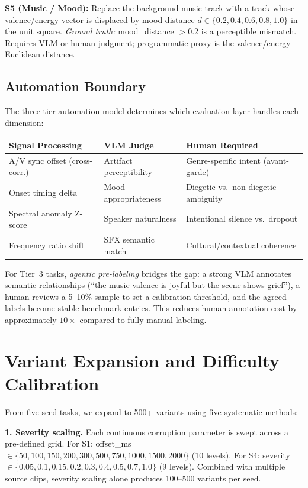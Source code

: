 \documentclass[11pt]{article}
\begin{document}
\textbf{S5 (Music / Mood):} Replace the background music track with a track whose
valence/energy vector is displaced by mood distance $d \in \{0.2, 0.4, 0.6, 0.8, 1.0\}$
in the unit square. \emph{Ground truth:} mood\_distance $> 0.2$ is a perceptible mismatch.
Requires VLM or human judgment; programmatic proxy is the valence/energy Euclidean distance.

\subsection{Automation Boundary}

The three-tier automation model determines which evaluation layer handles each dimension:

\begin{center}
\begin{tabular}{p{3.5cm}p{3.5cm}p{4cm}}
\toprule
Signal Processing & VLM Judge & Human Required \\
\midrule
A/V sync offset (cross-corr.) &
Artifact perceptibility &
Genre-specific intent (avant-garde) \\
Onset timing delta &
Mood appropriateness &
Diegetic vs.\ non-diegetic ambiguity \\
Spectral anomaly Z-score &
Speaker naturalness &
Intentional silence vs.\ dropout \\
Frequency ratio shift &
SFX semantic match &
Cultural/contextual coherence \\
\bottomrule
\end{tabular}
\end{center}

For Tier~3 tasks, \emph{agentic pre-labeling} bridges the gap: a strong VLM annotates
semantic relationships (``the music valence is joyful but the scene shows grief''), a human
reviews a 5--10\% sample to set a calibration threshold, and the agreed labels become stable
benchmark entries. This reduces human annotation cost by approximately $10\times$ compared
to fully manual labeling.

\section{Variant Expansion and Difficulty Calibration}

From five seed tasks, we expand to 500+ variants using five systematic methods:

\textbf{1. Severity scaling.} Each continuous corruption parameter is swept across a
pre-defined grid. For S1: offset\_ms $\in \{50, 100, 150, 200, 300, 500, 750, 1000, 1500,
2000\}$ (10 levels). For S4: severity $\in \{0.05, 0.1, 0.15, 0.2, 0.3, 0.4, 0.5, 0.7,
1.0\}$ (9 levels). Combined with multiple source clips, severity scaling alone produces
100--500 variants per seed.
\end{document}
